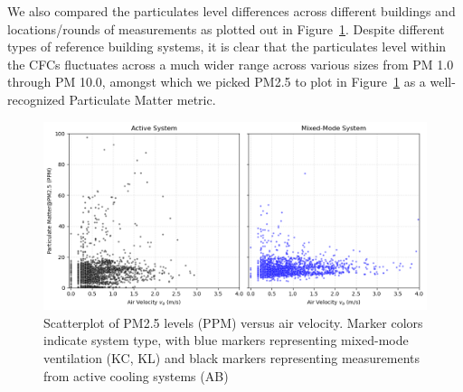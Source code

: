 \documentclass[preprint,12pt]{elsarticle}
\begin{document}



We also compared the particulates level differences across different buildings and locations/rounds of measurements as plotted out in Figure~\ref{fig:PMVals}. Despite different types of reference building systems, it is clear that the particulates level within the CFCs fluctuates across a much wider range across various sizes from PM 1.0 through PM 10.0, amongst which we picked PM2.5 to plot in Figure~\ref{fig:PMVals} as a well-recognized Particulate Matter metric.
    
    \begin{figure}[h!]
    \centering
    \includegraphics[width=0.85\linewidth]{img/air_pm.png}
    \caption{Scatterplot of PM2.5 levels (PPM) versus air velocity. Marker colors indicate system type, with blue markers representing mixed-mode ventilation (KC, KL) and black markers representing measurements from active cooling systems (AB)}\label{fig:PMVals}
    \end{figure}
\end{document}
